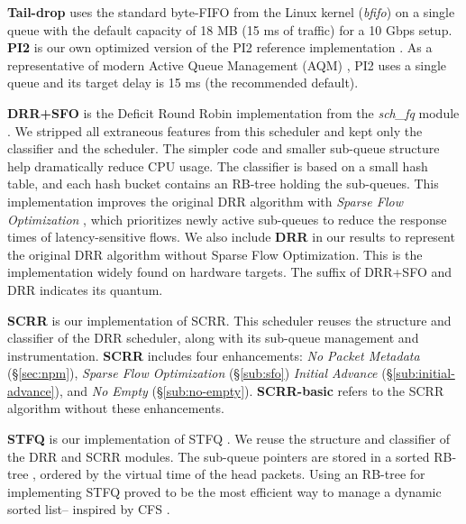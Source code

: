 \textbf{Tail-drop} uses the standard byte-FIFO from the Linux kernel
(\textit{bfifo}) on a single queue with the default capacity of 18 MB (15 ms of
traffic) for a 10 Gbps setup. \textbf{PI2} is our own optimized version of the PI2
reference implementation \cite{sch-dualpi2}. As a representative of
modern Active Queue Management (AQM) \cite{pi2}, PI2 uses a single
queue and its target delay is 15 ms (the recommended default).

\textbf{DRR+SFO} is the Deficit Round Robin implementation from the
\textit{sch\_fq} module \cite{sch-fq}. We stripped all extraneous
features from this scheduler and kept only the classifier and the
scheduler.  The simpler code and smaller sub-queue structure help
dramatically reduce CPU usage. The classifier is based on a small hash
table, and each hash bucket contains an RB-tree \cite{linux-rbtree}
holding the sub-queues. This implementation improves
the original DRR algorithm \cite{drr} with \textit{Sparse Flow Optimization}
\cite{sfo}, which prioritizes newly active sub-queues to
reduce the response times of latency-sensitive flows.
We also include \textbf{DRR} in our results to represent the original DRR algorithm without Sparse Flow Optimization. This is the implementation widely found on hardware targets.
The suffix of DRR+SFO and DRR indicates its quantum.

\textbf{SCRR} is our implementation of SCRR. This scheduler reuses the
structure and classifier of the DRR scheduler, along with its sub-queue management and instrumentation.  \textbf{SCRR} includes four
enhancements: \textit{No Packet Metadata} (\S\ref{sec:npm}), \textit{Sparse Flow Optimization} (\S\ref{sub:sfo})
\textit{Initial Advance} (\S\ref{sub:initial-advance}), and 
\textit{No Empty} (\S\ref{sub:no-empty}). \textbf{SCRR-basic} refers to the SCRR algorithm
without these enhancements.

\textbf{STFQ} is our implementation of STFQ \cite{stfq}. We reuse
the structure and classifier of the DRR and SCRR modules. The sub-queue pointers are stored in a sorted RB-tree \cite{linux-rbtree}, ordered by the virtual time of the head packets. Using an RB-tree for implementing STFQ proved to be the most efficient way to manage a dynamic sorted list-- inspired by CFS \cite{linux-cfs}. 

